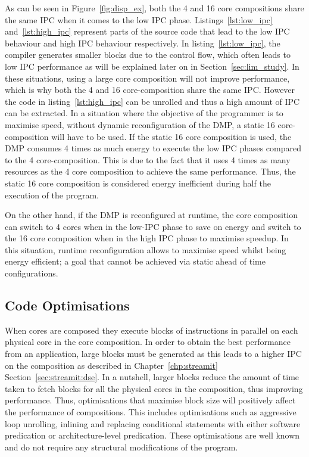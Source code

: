 As can be seen in Figure~\ref{fig:disp_ex}, both the 4 and 16 core compositions share the same IPC when it comes to the low IPC phase.
Listings~\ref{lst:low_ipc} and~\ref{lst:high_ipc} represent parts of the source code that lead to the low IPC behaviour and high IPC behaviour respectively.
In listing~\ref{lst:low_ipc}, the compiler generates smaller blocks due to the control flow, which often leads to low IPC performance as will be explained later on in Section~\ref{sec:lim_study}.
In these situations, using a large core composition will not improve performance, which is why both the 4 and 16 core-composition share the same IPC.
However the code in listing~\ref{lst:high_ipc} can be unrolled and thus a high amount of IPC can be extracted.
In a situation where the objective of the programmer is to maximise speed, without dynamic reconfiguration of the DMP, a static 16 core-composition will have to be used.
If the static 16 core composition is used, the DMP consumes 4 times as much energy to execute the low IPC phases compared to the 4 core-composition.
This is due to the fact that it uses 4 times as many resources as the 4 core composition to achieve the same performance.
Thus, the static 16 core composition is considered energy inefficient during half the execution of the program.

On the other hand, if the DMP is reconfigured at runtime, the core composition can switch to 4 cores when in the low-IPC phase to save on energy and switch to the 16 core composition when in the high IPC phase to maximise speedup.
In this situation, runtime reconfiguration allows to maximise speed whilst being energy efficient; a goal that cannot be achieved via static ahead of time configurations.

\subsection{Code Optimisations}

When cores are composed they execute blocks of instructions in parallel on each physical core in the core composition.
In order to obtain the best performance from an application, large blocks must be generated as this leads to a higher IPC on the composition as described in Chapter~\ref{chp:streamit} Section~\ref{sec:streamit:dse}.
In a nutshell, larger blocks reduce the amount of time taken to fetch blocks for all the physical cores in the composition, thus improving performance.
Thus, optimisations that maximise block size will positively affect the performance of compositions.
This includes optimisations such as aggressive loop unrolling, inlining and replacing conditional statements with either software predication or architecture-level predication.
These optimisations are well known and do not require any structural modifications of the program.

